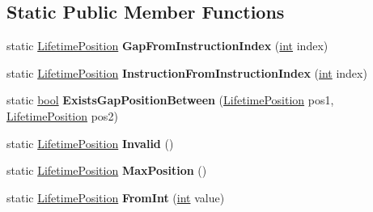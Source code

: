 \subsection*{Static Public Member Functions}
\begin{DoxyCompactItemize}
\item 
\mbox{\label{classv8_1_1internal_1_1compiler_1_1LifetimePosition_a99d5d744a757b2795d0fc42a315406a9}} 
static \mbox{\hyperlink{classv8_1_1internal_1_1compiler_1_1LifetimePosition}{Lifetime\+Position}} {\bfseries Gap\+From\+Instruction\+Index} (\mbox{\hyperlink{classint}{int}} index)
\item 
\mbox{\label{classv8_1_1internal_1_1compiler_1_1LifetimePosition_a32d9eb60b66b5eddb94c8a8bd69a877c}} 
static \mbox{\hyperlink{classv8_1_1internal_1_1compiler_1_1LifetimePosition}{Lifetime\+Position}} {\bfseries Instruction\+From\+Instruction\+Index} (\mbox{\hyperlink{classint}{int}} index)
\item 
\mbox{\label{classv8_1_1internal_1_1compiler_1_1LifetimePosition_a160fe342f01d4d9203f37e82877c358c}} 
static \mbox{\hyperlink{classbool}{bool}} {\bfseries Exists\+Gap\+Position\+Between} (\mbox{\hyperlink{classv8_1_1internal_1_1compiler_1_1LifetimePosition}{Lifetime\+Position}} pos1, \mbox{\hyperlink{classv8_1_1internal_1_1compiler_1_1LifetimePosition}{Lifetime\+Position}} pos2)
\item 
\mbox{\label{classv8_1_1internal_1_1compiler_1_1LifetimePosition_ab394c19abb7a07b49916bdecd6e0bd17}} 
static \mbox{\hyperlink{classv8_1_1internal_1_1compiler_1_1LifetimePosition}{Lifetime\+Position}} {\bfseries Invalid} ()
\item 
\mbox{\label{classv8_1_1internal_1_1compiler_1_1LifetimePosition_a0db50cd0c61da89622ba974be2de6af4}} 
static \mbox{\hyperlink{classv8_1_1internal_1_1compiler_1_1LifetimePosition}{Lifetime\+Position}} {\bfseries Max\+Position} ()
\item 
\mbox{\label{classv8_1_1internal_1_1compiler_1_1LifetimePosition_a40882269e85e8ace1d98b82e0e6419c2}} 
static \mbox{\hyperlink{classv8_1_1internal_1_1compiler_1_1LifetimePosition}{Lifetime\+Position}} {\bfseries From\+Int} (\mbox{\hyperlink{classint}{int}} value)
\end{DoxyCompactItemize}


